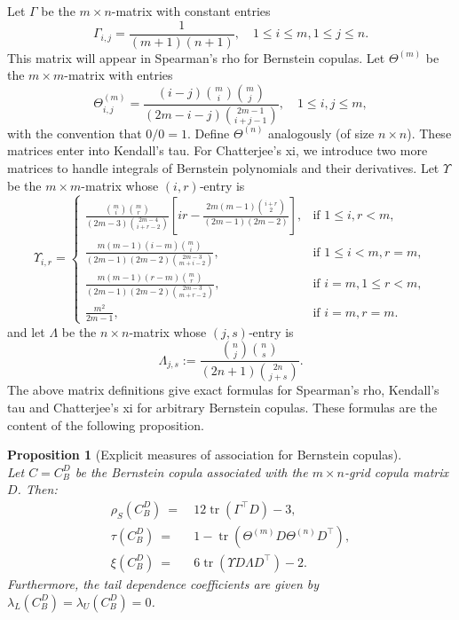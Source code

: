\documentclass{article}
\newtheorem{proposition}[thm]{Proposition}
\theoremstyle{definition}
\DeclareMathOperator{\tr}{tr}  %
\begin{document}
Let $\Gamma$ be the $m\times n$-matrix with constant entries
\[
   \Gamma_{i,j} = \frac{1}{(m+1)(n+1)},
   \quad 1\le i\le m, 1\le j\le n.
\]
This matrix will appear in Spearman’s rho for Bernstein copulas.
Let $\Theta^{(m)}$ be the $m\times m$-matrix with entries
\[
   \Theta^{(m)}_{i,j}
   =
   \frac{(i-j)\binom{m}{i}\binom{m}{j}}
        {\left(2m-i-j\right)\binom{2m-1}{i+j-1}},
   \quad
   1\le i,j \le m,
\]
with the convention that $0/0=1$.
Define $\Theta^{(n)}$ analogously (of size $n\times n$).  
These matrices enter into Kendall’s tau.
For Chatterjee’s xi, we introduce two more matrices to handle integrals of Bernstein polynomials and their derivatives.
Let $\Upsilon$ be the $m\times m$-matrix whose $(i,r)$‐entry is
\[
\Upsilon_{i,r} =
\begin{cases}
\displaystyle
\frac{\binom{m}{i}\binom{m}{r}}{(2m-3)\binom{2m-4}{i+r-2}}
\left[ir-\frac{2m(m-1)\binom{i+r}{2}}{(2m-1)(2m-2)}\right],
&\text{if } 1 \le i,r < m,\\[1.5em]
\displaystyle
\frac{m(m-1)(i-m)\binom{m}{i}}{(2m-1)(2m-2)\binom{2m-3}{m+i-2}},
&\text{if }1 \le i < m,r = m,\\[1.5em]
\displaystyle
\frac{m(m-1)(r-m)\binom{m}{r}}{(2m-1)(2m-2)\binom{2m-3}{m+r-2}},
&\text{if }i = m,1 \le r < m,\\[1em]
\frac{m^2}{2m-1},
& \text{if }i = m,r = m.
\end{cases}
\]
and let $\Lambda$ be the $n\times n$-matrix whose $(j,s)$‐entry is
\[
   \Lambda_{j,s}
   :=
   \frac{\binom{n}{j}\binom{n}{s}}{(2n+1)\binom{2n}{j+s}}
.\]
The above matrix definitions give exact formulas for Spearman's rho, Kendall's tau and Chatterjee's xi for arbitrary Bernstein copulas.
These formulas are the content of the following proposition.

\begin{proposition}[Explicit measures of association for Bernstein copulas]
\label{lem:bernstein_measures_of_association}
\ \\
Let $C = C^D_B$ be the Bernstein copula associated with the $m\times n$-grid copula matrix $D$. Then:
\begin{align*}
    \rho_S(C^D_B)
    ~=~& 12\tr\left(\Gamma^\top D\right)-3,
    \\
    \tau(C^D_B)
    ~=~& 1-\tr\left(\Theta^{(m)}D\Theta^{(n)}D^\top\right),
    \\
    \xi(C^D_B)
    ~=~& 6\tr\left(\Upsilon D\Lambda D^\top\right)-2.
\end{align*}
Furthermore, the tail dependence coefficients are given by $\lambda_L(C^D_B) = \lambda_U(C^D_B) = 0$.
\end{proposition}
\end{document}
